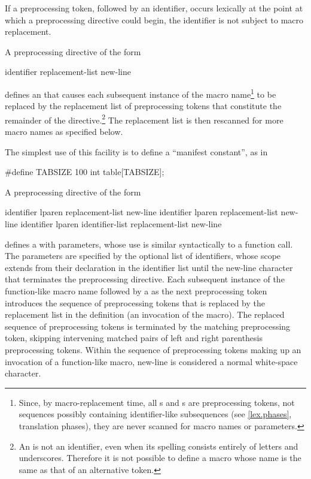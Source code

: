 \pnum
If a
\tcode{\#}
preprocessing token,
followed by an identifier,
occurs lexically
at the point at which a preprocessing directive could begin,
the identifier is not subject to macro replacement.

\pnum
A preprocessing directive of the form
\begin{ncsimplebnf}
 identifier replacement-list new-line
%
\end{ncsimplebnf}
defines an
 that
causes each subsequent instance of the macro name\footnote{Since, by macro-replacement time,
all s and s are preprocessing tokens,
not sequences possibly containing identifier-like subsequences
(see \ref{lex.phases}, translation phases),
they are never scanned for macro names or parameters.}
to be replaced by the replacement list of preprocessing tokens
that constitute the remainder of the directive.\footnote{An  is not an identifier,
even when its spelling consists entirely of letters and underscores.
Therefore it is not possible to define a macro
whose name is the same as that of an alternative token.}
The replacement list is then rescanned for more macro names as
specified below.

\pnum
\begin{example}
The simplest use of this facility is to define a ``manifest constant'',
as in
\begin{codeblock}
#define TABSIZE 100
int table[TABSIZE];
\end{codeblock}
\end{example}

\pnum
A preprocessing directive of the form
\begin{ncsimplebnf}
 identifier lparen  \terminal{)} replacement-list new-line\br
{} identifier lparen  \terminal{)} replacement-list new-line\br
{} identifier lparen identifier-list  \terminal{)} replacement-list new-line
\end{ncsimplebnf}
defines a 
with parameters, whose use is
similar syntactically to a function call.
The parameters
%
are specified by the optional list of identifiers,
whose scope extends from their declaration in the identifier list
until the new-line character that terminates the
preprocessing directive.
Each subsequent instance of the function-like macro name followed by a
\tcode{(}
as the next preprocessing token
introduces the sequence of preprocessing tokens that is replaced
by the replacement list in the definition
(an invocation of the macro).
%
The replaced sequence of preprocessing tokens is terminated by the matching
\tcode{)}
preprocessing token, skipping intervening matched pairs of left and
right parenthesis preprocessing tokens.
Within the sequence of preprocessing tokens making up an invocation
of a function-like macro,
new-line is considered a normal white-space character.

